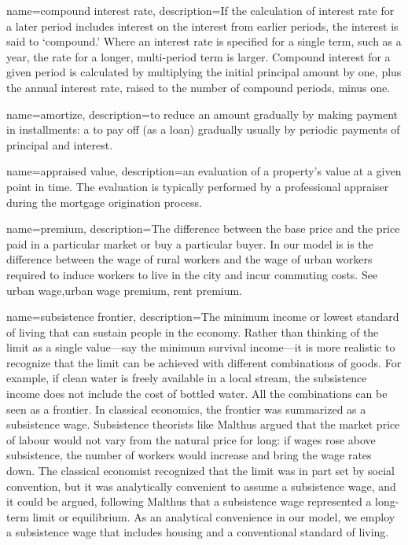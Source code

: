 {
name=compound interest rate,
description={If the calculation of interest rate for a later period includes interest on the interest from earlier periods, the interest is said to `compound.' Where an interest rate is specified for a single term, such as a year, the rate for a longer, multi-period term is larger. Compound interest for a given period is calculated by multiplying the initial principal amount by one, plus the annual interest rate, raised to the number of compound periods, minus one.} %
}

{
name=amortize,
description={to reduce an amount gradually by making payment in installments: a to pay off (as a loan) gradually usually by periodic payments of principal and interest. }
}

{
name=appraised value,
description={an evaluation of a property's value at a given point in time. The evaluation is typically performed by a professional appraiser during the mortgage origination process.}
}

{
name=premium,
description={The difference between the base price and the price paid in a particular market or buy a particular buyer. In our model is is the difference between the wage of rural workers and the wage of urban workers required to induce workers to live in the city and incur commuting costs. See \gls{urban wage},\gls{urban wage premium}, \gls{rent premium}.}
}

{
name=subsistence frontier,
description={The minimum income or lowest standard of living that can sustain people in the economy. Rather than thinking of the limit as a single value---say the minimum survival income---it is more realistic to recognize that the limit can be achieved with different combinations of goods. For example, if clean water is freely available in a local stream, the subsistence income does not include the cost of bottled water. All the combinations can be seen as a \gls{frontier}. \newline In classical economics, the frontier was summarized as a subsistence wage. Subsistence theorists like Malthus argued that the market price of labour would not vary from the natural price for long: if wages rose above subsistence, the number of workers would increase and bring the wage rates down. The classical economist recognized that the limit was in part set by social convention, but it was analytically convenient to assume a subsistence wage, and it could be argued, following Malthus that a subsistence wage  represented a long-term limit or \gls{equilibrium}. As an analytical convenience in our model, we employ a subsistence wage that includes housing and a conventional standard of living.  }
}

